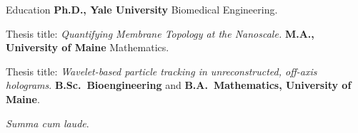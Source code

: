\begin{rubric}{Education}
\entry*[2017 -- 2022]%
	\textbf{Ph.D., Yale University} Biomedical Engineering.
	\par Thesis title: \emph{Quantifying Membrane Topology at the Nanoscale.}
%
\entry*[2015 -- 2017]%
	\textbf{M.A., University of Maine} Mathematics.\par Thesis title: \emph{Wavelet-based particle tracking in unreconstructed, off-axis holograms}.
% 
\entry*[2012 -- 2015]%
	\textbf{B.Sc.~Bioengineering} and \textbf{B.A.~Mathematics, University of Maine}.\par
	\emph{Summa cum laude}.
\end{rubric}